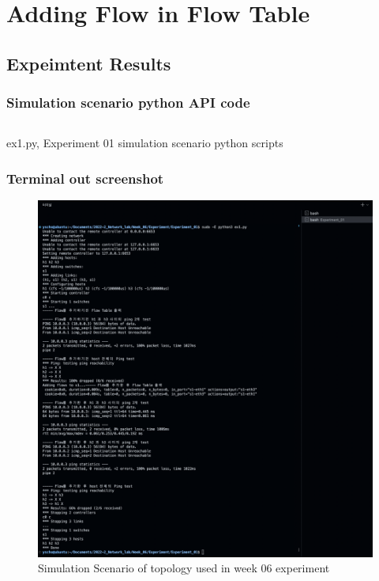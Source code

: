 \section{Adding Flow in Flow Table}
\subsection{Expeimtent Results}

\subsubsection{Simulation scenario python API code}
\begin{listing}[h!]
\inputminted[framerule = 1pt,framesep = 2mm , frame = lines, fontsize=\scriptsize]{python}{./code/week06/Experiment01.py}
\caption{\footnotesize ex1.py, Experiment 01 simulation scenario python scripts}
\end{listing}
\clearpage
\subsubsection{Terminal out screenshot}
\begin{figure}[!h]\centering 
	\includegraphics[width=.99\textwidth]{image/week06/1-2.png}
	\caption{\footnotesize 
	Simulation Scenario of topology used in week 06 experiment}
	\vspace{-10pt}
\end{figure}
\clearpage